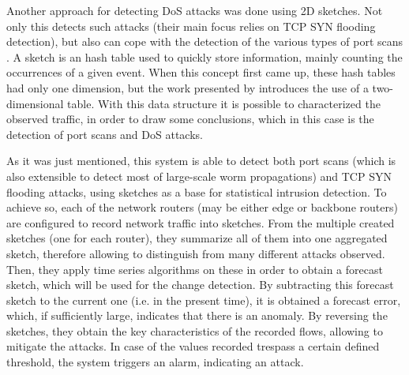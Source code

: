 \documentclass[runningheads,a4paper]{llncs}
\begin{document}
Another approach for detecting DoS attacks was done using 2D sketches. Not only this detects such attacks (their main focus relies on TCP SYN flooding detection), but also can cope with the detection of the various types of port scans \cite{Gao2006}. A sketch is an hash table used to quickly store information, mainly counting the occurrences of a given event. When this concept first came up, these hash tables had only one dimension, but the work presented by \cite{Gao2006} introduces the use of a two-dimensional table. With this data structure it is possible to characterized the observed traffic, in order to draw some conclusions, which in this case is the detection of port scans and DoS attacks.

As it was just mentioned, this system is able to detect both port scans (which is also extensible to detect most of large-scale worm propagations) and TCP SYN flooding attacks, using sketches as a base for statistical intrusion detection. To achieve so, each of the network routers (may be either edge or backbone routers) are configured to record network traffic into sketches. From the multiple created sketches (one for each router), they summarize all of them into one aggregated sketch, therefore allowing to distinguish from many different attacks observed. Then, they apply time series algorithms on these in order to obtain a forecast sketch, which will be used for the change detection. By subtracting this forecast sketch to the current one (i.e. in the present time), it is obtained a forecast error, which, if sufficiently large, indicates that there is an anomaly. By reversing the sketches, they obtain the key characteristics of the recorded flows, allowing to mitigate the attacks. In case of the values recorded trespass a certain defined threshold, the system triggers an alarm, indicating an attack.
\end{document}
